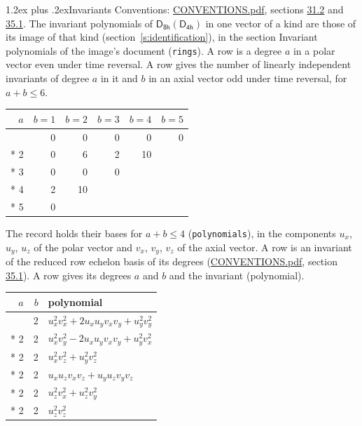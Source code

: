 \documentclass[10pt,a4paper]{article}
\makeatletter
\renewcommand\section{\@startsection{section}{1}{\z@}{-3ex plus -1ex minus -.2ex}%
  {1.2ex plus .2ex}{\normalfont\large\sffamily\bfseries\color{parttitle}}}
\numberwithin{equation}{section}
\newcommand{\grp}[1]{\mathsf{#1}}
\makeatother
\begin{document}
\section{Invariants}\label{s:invariants}
Conventions: \href{../../CONVENTIONS.pdf}{CONVENTIONS.pdf}, sections \href{../../CONVENTIONS.pdf\#conv.31.2}{31.2} and \href{../../CONVENTIONS.pdf\#conv.35.1}{35.1}.
The invariant polynomials of $\grp{D_{8h}}(\grp{D_{4h}})$ in one vector of a kind are those of its image of that kind (section~\ref{s:identification}), in the section Invariant polynomials of the image's document (\texttt{rings}).
\leavevmode\label{n:index.degree.polar}\label{n:index.degree.axial}A row is a degree $a$ in a polar vector even under time reversal. A row gives the number of linearly independent invariants of degree $a$ in it and $b$ in an axial vector odd under time reversal, for $a + b \le 6$.
{\small\begin{longtable}{@{}rrrrrr@{}}\toprule
$a$ & $b = 1$ & $b = 2$ & $b = 3$ & $b = 4$ & $b = 5$\\\midrule\endhead
\bottomrule\endfoot\endlastfoot
1 & 0 & 0 & 0 & 0 & 0\\*
2 & 0 & 6 & 2 & 10 & \\*
3 & 0 & 0 & 0 &  & \\*
4 & 2 & 10 &  &  & \\*
5 & 0 &  &  &  & \\
\bottomrule\end{longtable}}
\leavevmode\label{n:local.component.polar}\label{n:local.component.axial}The record holds their bases for $a + b \le 4$ (\texttt{polynomials}), in the components $u_{x}$, $u_{y}$, $u_{z}$ of the polar vector and $v_{x}$, $v_{y}$, $v_{z}$ of the axial vector. \label{n:head.polynomial}A row is an invariant of the reduced row echelon basis of its degrees (\href{../../CONVENTIONS.pdf}{CONVENTIONS.pdf}, section \href{../../CONVENTIONS.pdf\#conv.35.1}{35.1}). A row gives its degrees $a$ and $b$ and the invariant (polynomial).
{\small\renewcommand{\arraystretch}{1.2}\begin{longtable}{@{}rrl@{}}\toprule
$a$ & $b$ & polynomial\\\midrule\endhead
\bottomrule\endfoot\endlastfoot
2 & 2 & $u_{x}^{2}v_{x}^{2} + 2u_{x}u_{y}v_{x}v_{y} + u_{y}^{2}v_{y}^{2}$\\*
2 & 2 & $u_{x}^{2}v_{y}^{2} - 2u_{x}u_{y}v_{x}v_{y} + u_{y}^{2}v_{x}^{2}$\\*
2 & 2 & $u_{x}^{2}v_{z}^{2} + u_{y}^{2}v_{z}^{2}$\\*
2 & 2 & $u_{x}u_{z}v_{x}v_{z} + u_{y}u_{z}v_{y}v_{z}$\\*
2 & 2 & $u_{z}^{2}v_{x}^{2} + u_{z}^{2}v_{y}^{2}$\\*
2 & 2 & $u_{z}^{2}v_{z}^{2}$\\
\bottomrule\end{longtable}}
\end{document}
